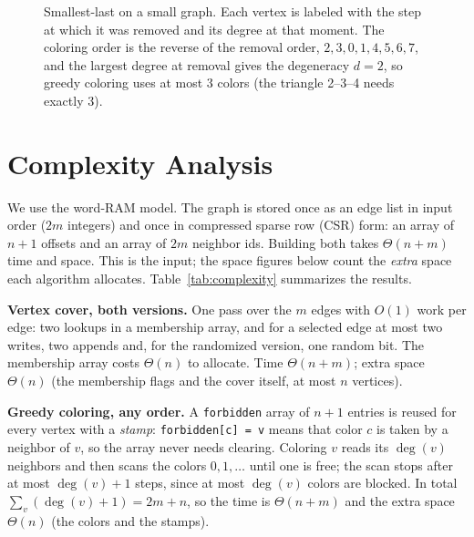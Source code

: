 \documentclass[acmsmall,nonacm]{acmart}
\newcommand{\code}[1]{\texttt{#1}}
\begin{document}
\begin{figure}[t]
\centering
{}
\caption{Smallest-last on a small graph. Each vertex is labeled with the step at which it was removed and its degree at that moment. The coloring order is the reverse of the removal order, $2,3,0,1,4,5,6,7$, and the largest degree at removal gives the degeneracy $d=2$, so greedy coloring uses at most 3 colors (the triangle 2--3--4 needs exactly 3).}
\label{fig:sl-example}
\end{figure}

\section{Complexity Analysis}
\label{sec:complexity}

We use the word-RAM model. The graph is stored once as an edge list in input
order ($2m$ integers) and once in compressed sparse row (CSR) form: an array
of $n+1$ offsets and an array of $2m$ neighbor ids. Building both takes
$\Theta(n+m)$ time and space. This is the input; the space figures below count
the \emph{extra} space each algorithm allocates. Table~\ref{tab:complexity}
summarizes the results.

\textbf{Vertex cover, both versions.} One pass over the $m$ edges with $O(1)$
work per edge: two lookups in a membership array, and for a selected edge at
most two writes, two appends and, for the randomized version, one random bit.
The membership array costs $\Theta(n)$ to allocate. Time $\Theta(n+m)$; extra
space $\Theta(n)$ (the membership flags and the cover itself, at most $n$
vertices).

\textbf{Greedy coloring, any order.} A \code{forbidden} array of $n+1$ entries
is reused for every vertex with a \emph{stamp}: \code{forbidden[c] = v} means
that color $c$ is taken by a neighbor of $v$, so the array never needs
clearing. Coloring $v$ reads its $\deg(v)$ neighbors and then scans the colors
$0,1,\ldots$ until one is free; the scan stops after at most $\deg(v)+1$ steps,
since at most $\deg(v)$ colors are blocked. In total
$\sum_v(\deg(v)+1)=2m+n$, so the time is $\Theta(n+m)$ and the extra space
$\Theta(n)$ (the colors and the stamps).
\end{document}
